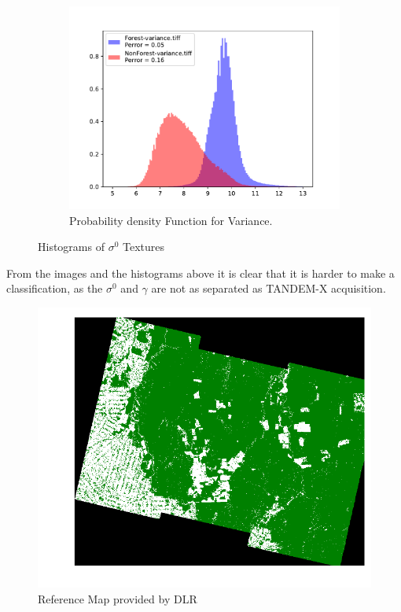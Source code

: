 \begin{figure}[H]
    \centering
    \begin{subfigure}[b]{0.4\linewidth}
        \includegraphics[width=\linewidth]{Chapter5/SENTINEL1/Sigma0/variance_histogram.pdf}
        \caption{Probability density Function for Variance.}
        \end{subfigure}
    \caption{Histograms of $\sigma^0$ Textures}
    \label{fig: sentinel_sigma_hist}
\end{figure}

From the images and the histograms above it is clear that it is harder to make a classification, as the $\sigma^0$ and $\gamma$ are not as separated as TANDEM-X acquisition.
\begin{figure}[H]
    \centering
    \includegraphics[width=\linewidth]{Chapter5/TANDEM-X/reference_mapimage.pdf}
    \caption{Reference Map provided by DLR}
    \label{fig:ref_sentinel}
\end{figure}{}

